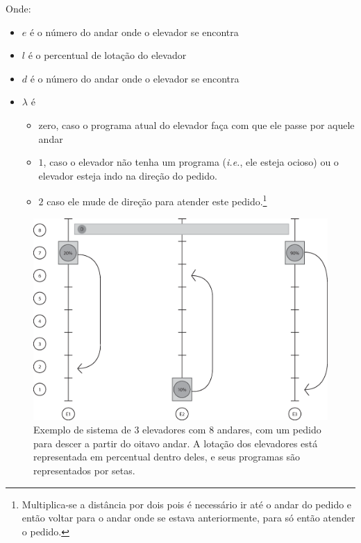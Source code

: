 Onde:
\begin{itemize}
\item \textbf{$e$} é o número do andar onde o elevador se encontra
\item \textbf{$l$} é o percentual de lotação do elevador
\item \textbf{$d$} é o número do andar onde o elevador se encontra
\item \textbf{$\lambda$} é
  \begin{itemize}
    \item zero, caso o programa atual do elevador faça com que ele passe por
      aquele andar
    \item $1$, caso o elevador não tenha um programa (\textit{i.e.},
      ele esteja ocioso) ou o elevador esteja indo na direção do pedido.
    \item $2$ caso ele mude de direção para atender este pedido.\footnote{Multiplica-se
        a distância por dois pois é necessário ir até o andar do pedido e então
        voltar para o andar onde se estava anteriormente, para só então atender
        o pedido.}
  \end{itemize}
\end{itemize}

\begin{figure}[htb!]
  \centering
  \includegraphics[scale=0.6]{img/elevator_example1.eps}
  \caption[Exemplo de sistema de 3 elevadores com 8 andares]{Exemplo de sistema
    de 3 elevadores com 8 andares, com um pedido para descer a partir do oitavo
    andar. A lotação dos elevadores está representada em percentual dentro
    deles, e seus programas são representados por setas.}
  \label{fig:elevadores-1}
\end{figure}

